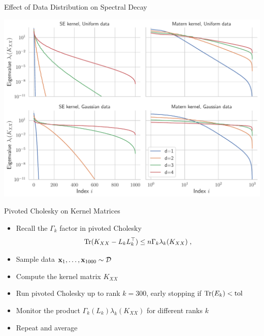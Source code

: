 \documentclass{beamer}
\begin{document}
\begin{frame}{Effect of Data Distribution on Spectral Decay}
\begin{center}
    \includegraphics[width=\textwidth]{report/res/kernel_eigvals.pdf}
\end{center}
\end{frame}


\begin{frame}{Pivoted Cholesky on Kernel Matrices}
\begin{itemize}[<+->]
    \item Recall the $\Gamma_k$ factor in pivoted Cholesky
    \begin{equation*}
        \operatorname{Tr}(K_{XX} - L_kL_k^\top) \le n \Gamma_k \lambda_k(K_{XX}) \;,
    \end{equation*}
    \item Sample data $\boldsymbol{\mathbf{x}}_1, \ldots, \boldsymbol{\mathbf{x}}_{1000} \sim \mathcal D$
    \item Compute the kernel matrix $K_{XX}$
    \item Run pivoted Cholesky up to rank $k=300$, early stopping if $\operatorname{Tr}(E_k) < \text{tol}$
    \item Monitor the product $\Gamma_k(L_k) \lambda_k(K_{XX})$ for different ranks $k$
    \item Repeat and average
    
\end{itemize}
\end{frame}
\end{document}
